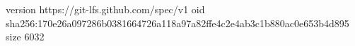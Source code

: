 version https://git-lfs.github.com/spec/v1
oid sha256:170e26a097286b0381664726a118a97a82ffe4c2e4ab3c1b880ac0e653b4d895
size 6032
